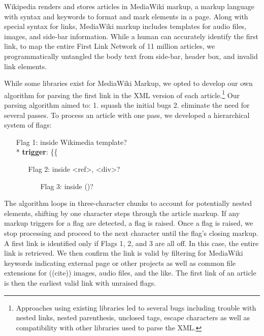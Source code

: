 \documentclass[twoside]{article}
\newcommand{\bt}[1]{\textbf{#1}} %
\newcommand{\red}[1]{{\leavevmode\color{sred}{#1}}} %
\begin{document}
Wikipedia renders and stores articles in MediaWiki markup, a markup language with syntax and keywords to format and mark elements in a page. Along with special syntax for links, MediaWiki markup includes templates for audio files, images, and side-bar
information.
While a human can accurately identify the first link, to map the entire First Link Network of 11 million articles, we programmatically untangled the body text from side-bar, header box, and invalid link elements.

While some libraries exist for MediaWiki Markup, we opted to develop our own algorithm for parsing the first link in the XML version of each article.\footnote{
Approaches using existing libraries led to several bugs 
including trouble with nested links, nested parenthesis, unclosed tags, escape characters 
as well as compatibility with other libraries used to parse the XML.}
Our parsing algorithm aimed to: 
1. squash the initial bugs 
2. eliminate the need for several passes. 
To process an article with one pass, we developed a hierarchical system of flags:
\begin{itemize}
    \item[Flag 1:] inside Wikimedia template?\\
        * \bt{trigger}: \{\{
    \begin{itemize}
        \item[Flag 2:] inside <ref>, <div>?
        \begin{itemize}
            \item[Flag 3:] inside ()?
        \end{itemize}
    \end{itemize}
\end{itemize}

\red{[[better graphic to come]]}

The algorithm loops in three-character chunks to account for potentially nested elements, 
shifting by one character steps through the article markup.
If any markup triggers for a flag are detected, a flag is raised. 
Once a flag is raised, we stop processing and proceed to the next character
until the flag's closing markup.
A first link is identified only if Flags 1, 2, and 3 are all off.
In this case, the entire link is retrieved. 
We then confirm the link is valid by filtering for MediaWiki keywords indicating external page or other projects
as well as common file extensions for 
((cite))
images, audio files, and the like.
The first link of an article is then the earliest valid link with unraised flags.
\end{document}
